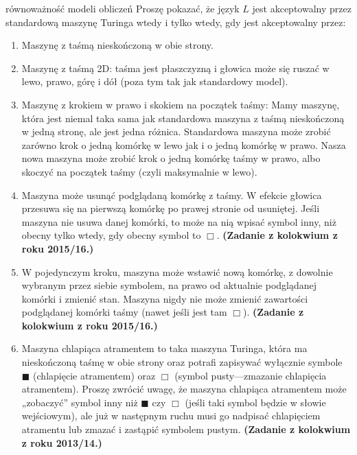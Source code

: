 \begin{exercise}{równoważność modeli obliczeń}
    Proszę pokazać, że język $L$ jest akceptowalny przez standardową maszynę Turinga wtedy i tylko wtedy, gdy jest akceptowalny przez:

\begin{enumerate}
    \item Maszynę z taśmą nieskończoną w obie strony.
    
    \item Maszynę z taśmą 2D: taśma jest płaszczyzną i głowica może się ruszać w lewo, prawo, górę i dół (poza tym tak jak standardowy model).
    
    \item Maszynę z krokiem w prawo i skokiem na początek taśmy: Mamy maszynę, która jest niemal taka sama jak standardowa maszyna z taśmą nieskończoną w jedną stronę, ale jest jedna różnica. Standardowa maszyna może zrobić zarówno krok o jedną komórkę w lewo jak i o jedną komórkę w prawo. Nasza nowa maszyna może zrobić krok o jedną komórkę taśmy w prawo, albo skoczyć na początek taśmy (czyli maksymalnie w lewo).
    
    \item Maszyna może usunąć podglądaną komórkę z taśmy. W efekcie głowica przesuwa się na pierwszą komórkę po prawej stronie od usuniętej. Jeśli maszyna nie usuwa danej komórki, to może na nią wpisać symbol inny, niż obecny tylko wtedy, gdy obecny symbol to $\Box$. \textbf{(Zadanie z kolokwium z roku 2015/16.)}
    
    \item W pojedynczym kroku, maszyna może wstawić nową komórkę, z dowolnie wybranym przez siebie symbolem, na prawo od aktualnie podglądanej komórki i zmienić stan. Maszyna nigdy nie może zmienić zawartości podglądanej komórki taśmy (nawet jeśli jest tam $\Box$). \textbf{(Zadanie z kolokwium z roku 2015/16.)}
    
    \item Maszyna chlapiąca atramentem to taka maszyna Turinga, która ma nieskończoną taśmę w obie strony oraz potrafi zapisywać wyłącznie symbole $\blacksquare$ (chlapięcie atramentem) oraz $\Box$ (symbol pusty—zmazanie chlapięcia atramentem). Proszę zwrócić uwagę, że maszyna chlapiąca atramentem może „zobaczyć” symbol inny niż $\blacksquare$ czy $\Box$ (jeśli taki symbol będzie w słowie wejściowym), ale już w następnym ruchu musi go nadpisać chlapięciem atramentu lub zmazać i zastąpić symbolem pustym. \textbf{(Zadanie z kolokwium z roku 2013/14.)}
\end{enumerate}
\end{exercise}

